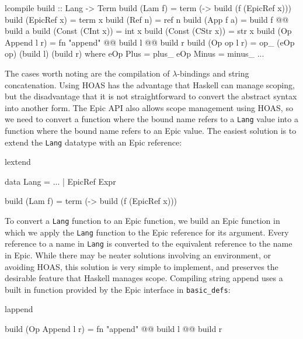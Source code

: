 \begin{SaveVerbatim}{lcompile}
build :: Lang -> Term
build (Lam f)          = term (\x -> build (f (EpicRef x)))
build (EpicRef x)      = term x
build (Ref n)          = ref n
build (App f a)        = build f @@ build a
build (Const (CInt x)) = int x
build (Const (CStr x)) = str x
build (Op Append l r)  = fn "append" @@ build l @@ build r
build (Op op l r)      = op_ (eOp op) (build l) (build r)
    where eOp Plus   = plus_
          eOp Minus  = minus_
          ...
\end{SaveVerbatim}

\noindent
The cases worth noting are the compilation of $\lambda$-bindings and
string concatenation. Using HOAS has the advantage that Haskell can
manage scoping, but the disadvantage that it is not straightforward to
convert the abstract syntax into another form. The Epic API also
allows scope management using HOAS, so we need to convert a function
where the bound name refers to a \texttt{Lang} value into a function
where the bound name refers to an Epic value. The easiest solution is
to extend the \texttt{Lang} datatype with an Epic reference:

\begin{SaveVerbatim}{lextend}

data Lang = ...
          | EpicRef Expr

build (Lam f) = term (\x -> build (f (EpicRef x)))

\end{SaveVerbatim}

\noindent
To convert a \texttt{Lang} function to an Epic function, we build an
Epic function in which we apply the \texttt{Lang} function to the Epic
reference for its argument. Every reference to a name in \texttt{Lang}
is converted to the equivalent reference to the name in Epic. While
there may be neater solutions involving an environment, or avoiding
HOAS, this solution is very simple to implement, and preserves the
desirable feature that Haskell manages scope.
Compiling string append uses a built in function provided by the Epic
interface in \texttt{basic\_defs}:

\begin{SaveVerbatim}{lappend}

build (Op Append l r) = fn "append" @@ build l @@ build r

\end{SaveVerbatim}

